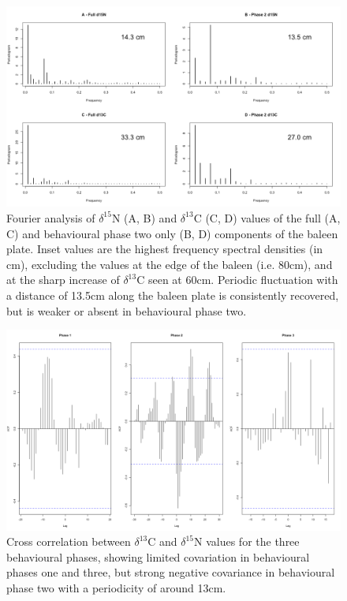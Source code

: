 \documentclass[a4paper,10pt]{article}
\begin{document}
\newpage
\begin{figure}[!htbp]
  \centering
  \includegraphics[width = \linewidth]{figures/Figure-S1-periodograms.png}
  \caption{Fourier analysis of $\delta^{15}$N (A, B) and $\delta^{13}$C (C, D) values of the full (A, C) and behavioural phase two only (B, D) components of the baleen plate. Inset values are the highest frequency spectral densities (in cm), excluding the values at the edge of the baleen (i.e. 80cm), and at the sharp increase of $\delta^{13}$C seen at 60cm. Periodic fluctuation with a distance of 13.5cm along the baleen plate is consistently recovered, but is weaker or absent in behavioural phase two.} 
  \label{figs1}
\end{figure}
 
\begin{figure}[!htbp]
  \centering
  \includegraphics[width = \linewidth]{figures/Figure-S2-cross-cor.png}
  \caption{Cross correlation between $\delta^{13}$C and $\delta^{15}$N values for the three behavioural phases, showing limited covariation in behavioural phases one and three, but strong negative covariance in behavioural phase two with a periodicity of around 13cm.
  }
  \label{figs2}
\end{figure}
 
\end{document}
